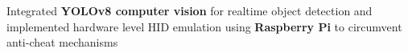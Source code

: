 \documentclass[]{peter_resume}
\begin{document}
\begin{minipage}{\textwidth}
 
\begin{tightemize}
\item Integrated \textbf{YOLOv8 computer vision} for realtime object detection and implemented hardware level HID emulation using \textbf{Raspberry Pi} to circumvent anti-cheat mechanisms
\end{tightemize} 
\sectionsep

\end{minipage}
\end{document}

